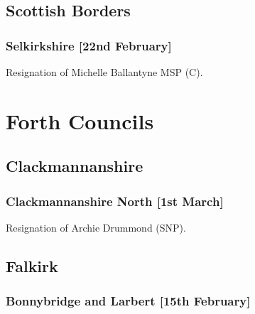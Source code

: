 \documentclass[a4paper,openany]{book}
\begin{document}
\begin{resultsiii}
\subsection*{Scottish Borders}

\subsubsection*{Selkirkshire \hspace*{\fill}\nolinebreak[1]%
\enspace\hspace*{\fill}
[22nd February]}


Resignation of Michelle Ballantyne MSP (C).

\section{Forth Councils}

\subsection*{Clackmannanshire}

\subsubsection*{Clackmannanshire North \hspace*{\fill}\nolinebreak[1]%
\enspace\hspace*{\fill}
[1st March]}


Resignation of Archie Drummond (SNP).

\subsection*{Falkirk}

\subsubsection*{Bonnybridge and Larbert \hspace*{\fill}\nolinebreak[1]%
\enspace\hspace*{\fill}
[15th February]}



\end{resultsiii}
\end{document}

